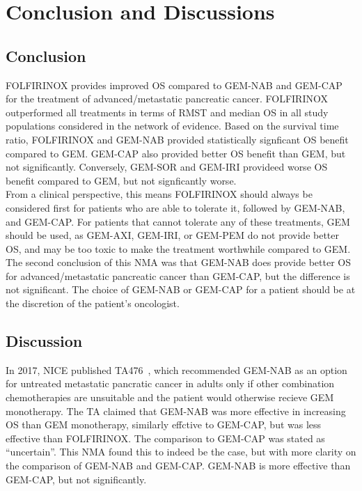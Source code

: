 \chapter{Conclusion and Discussions}\label{conclusions}

\section{Conclusion}
FOLFIRINOX provides improved OS compared to GEM-NAB and GEM-CAP for the treatment of advanced/metastatic pancreatic cancer. FOLFIRINOX outperformed all treatments in terms of RMST and median OS in all study populations considered in the network of evidence. Based on the survival time ratio, FOLFIRINOX and GEM-NAB provided statistically signficant OS benefit compared to GEM. GEM-CAP also provided better OS benefit than GEM, but not significantly. Conversely, GEM-SOR and GEM-IRI provideed worse OS benefit compared to GEM, but not signficantly worse. \\

From a clinical perspective, this means FOLFIRINOX should always be considered first for patients who are able to tolerate it, followed by GEM-NAB, and GEM-CAP. For patients that cannot tolerate any of these treatments, GEM should be used, as GEM-AXI, GEM-IRI, or GEM-PEM do not provide better OS, and may be too toxic to make the treatment worthwhile compared to GEM.\\

The second conclusion of this NMA was that GEM-NAB does provide better OS for advanced/metastatic pancreatic cancer than GEM-CAP, but the difference is not significant. The choice of GEM-NAB or GEM-CAP for a patient should be at the discretion of the patient's oncologist.

\section{Discussion}
In 2017, NICE published TA476~\cite{TA476}, which recommended GEM-NAB as an option for untreated metastatic pancratic cancer in adults only if other combination chemotherapies are unsuitable and the patient would otherwise recieve GEM monotherapy. The TA claimed that GEM-NAB was more effective in increasing OS than GEM monotherapy, similarly effctive to GEM-CAP, but was less effective than FOLFIRINOX. The comparison to GEM-CAP was stated as ``uncertain''. This NMA found this to indeed be the case, but with more clarity on the comparison of GEM-NAB and GEM-CAP. GEM-NAB is more effective than GEM-CAP, but not significantly. \\ 

